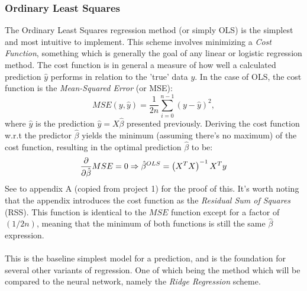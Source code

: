         \subsubsection{Ordinary Least Squares}
            The Ordinary Least Squares regression method (or simply OLS) is the simplest and most intuitive to implement. This scheme involves minimizing a \textit{Cost Function}, something which is generally the goal of any linear or logistic regression method. The cost function is in general a measure of how well a calculated prediction $\hat{y}$ performs in relation to the 'true' data $y$. In the case of OLS, the cost function is the \textit{Mean-Squared Error} (or MSE):
            \begin{equation}
                MSE(y, \hat{y})=\frac1{2n}\sum_{i=0}^{n-1} \left( y-\hat{y} \right)^2,
            \end{equation}
            where $\hat{y}$ is the prediction $\hat{y}=X\hat{\beta}$ presented previously. Deriving the cost function w.r.t the predictor $\hat{\beta}$ yields the minimum (assuming there's no maximum) of the cost function, resulting in the optimal prediction $\hat{\beta}$ to be:
            \begin{equation}
                \pdv{}{\hat{\beta}}MSE=0\Rightarrow \hat{\beta}^{OLS} = \left( X^TX \right)^{-1}X^Ty
            \end{equation}
            See to appendix A (copied from project 1) for the proof of this. It's worth noting that the appendix introduces the cost function as the \textit{Residual Sum of Squares} (RSS). This function is identical to the $MSE$ function except for a factor of $(1/2n)$, meaning that the minimum of both functions is still the same $\hat{\beta}$ expression. \\\\
            This is the baseline simplest model for a prediction, and is the foundation for several other variants of regression. One of which being the method which will be compared to the neural network, namely the \textit{Ridge Regression} scheme.
            
